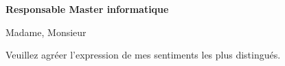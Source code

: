 \documentclass[11pt]{letter}
\date{\today}
\begin{document}
\begin{letter}{\textbf{Responsable Master informatique}}
\opening{Madame, Monsieur}



\closing{Veuillez agréer l'expression de mes sentiments les plus distingués.}
\end{letter}
\end{document}
